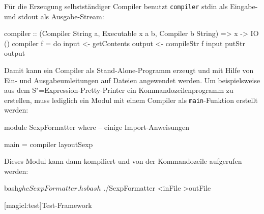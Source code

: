 \documentclass[11pt, a4paper, bibgerm]{scrbook}
\newenvironment{DIFnomarkup}{}{}
\newcommand\icode[1]{\lstinline?#1?}
\newcommand\lsection{}
\newcommand{\sexp}{S"=Expression}
\begin{document}
Für die Erzeugung selbstständiger Compiler benutzt \icode{compiler}
stdin als Eingabe- und stdout als Ausgabe-Stream:
\begin{DIFnomarkup}\begin{code}
compiler :: (Compiler String a, Executable x a b, Compiler b String) => x -> IO ()
compiler f = do
  input <- getContents
  output <- compileStr f input
  putStr output  
\end{code}\end{DIFnomarkup}
Damit kann ein Compiler als Stand-Alone-Programm erzeugt und mit Hilfe
von Ein- und Ausgabeumleitungen auf Dateien angewendet werden. Um
beispielsweise aus dem \sexp{}-Pretty-Printer ein Kommandozeilenprogramm
zu erstellen, muss lediglich ein Modul mit einem Compiler als
\icode{main}-Funktion erstellt werden: 
\begin{DIFnomarkup}\begin{code}
module SexpFormatter where
-- einige Import-Anweisungen

main = compiler layoutSexp
\end{code}\end{DIFnomarkup}
Dieses Modul kann dann kompiliert und von der Kommandozeile
aufgerufen werden:
\begin{DIFnomarkup}\begin{code}
bash$ ghc SexpFormatter.hs
bash$ ./SexpFormatter <inFile >outFile
\end{code}\end{DIFnomarkup}

\lsection[magicl:test]{Test-Framework}
\end{document}
